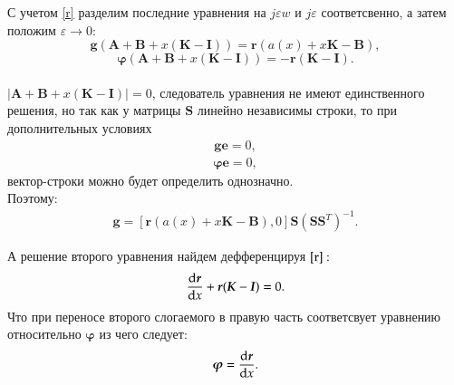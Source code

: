 С учетом \eqref{r} разделим последние уравнения на $j\varepsilon w$ и $j \varepsilon$ соответсвенно, а затем положим $\varepsilon \rightarrow 0$:
\[\boldsymbol{g}(\boldsymbol{A}+\boldsymbol{B} + x(\boldsymbol{K}-\boldsymbol{I})) = \boldsymbol{r}(a(x)+x\boldsymbol{K}-\boldsymbol{B}),\]	
\[\boldsymbol{\varphi}(\boldsymbol{A}+\boldsymbol{B} + x(\boldsymbol{K}-\boldsymbol{I})) = -\boldsymbol{r}(\boldsymbol{K}-\boldsymbol{I}).\]\\
$|\boldsymbol{A}+\boldsymbol{B} + x(\boldsymbol{K}-\boldsymbol{I})|=0$, следователь уравнения не имеют единственного решения, но так как у матрицы $\boldsymbol{S}$ линейно независимы строки, то при дополнительных условиях
\begin{align}\label{ge}
	\boldsymbol{ge} = 0,
\end{align}
\begin{align}\label{fe}
	\boldsymbol{\varphi e} = 0,
\end{align}
вектор-строки можно будет определить однозначно.\\
Поэтому:
\begin{align}
	\boldsymbol{g}=[\boldsymbol{r}(a(x)+x\boldsymbol{K}-\boldsymbol{B}), 0]\boldsymbol{S}(\boldsymbol{S}\boldsymbol{S}^T)^{-1}.
\end{align}

А решение второго уравнения найдем дефференцируя $\eqref{r}:$\\
\[ \dv{\boldsymbol{r}}{x}(\boldsymbol{A}+\boldsymbol{B} + x(\boldsymbol{K}-\boldsymbol{I})) + \boldsymbol{r}(\boldsymbol{K}-\boldsymbol{I}) = 0.\]
Что при переносе второго слогаемого в правую часть соответсвует уравнению относительно $\boldsymbol{\varphi}$ из чего следует:\\
\begin{align}\label{phi}
	\boldsymbol{\varphi} = \dv{\boldsymbol{r}}{x}.
\end{align}


